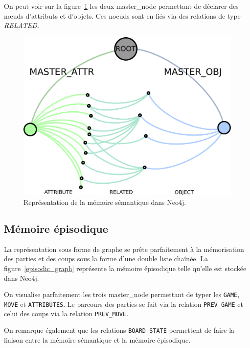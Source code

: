 On peut voir sur la figure~\ref{lattice_graph} les deux \og master\_node \fg{} permettant de déclarer des nœuds d'attributs et d'objets. Ces noeuds sont en liés via des relations de type \emph{RELATED}.

\begin{figure}[H]
\includegraphics[width=\textwidth]{files/neo4j/lattice_graph}
\caption{Représentation de la mémoire sémantique dans Neo4j.}
\label{lattice_graph}
\end{figure}

\subsection{Mémoire épisodique}

La représentation sous forme de graphe se prête parfaitement à la mémorisation des parties et des coups sous la forme d'une double liste chaînée. La figure~\ref{episodic_graph} représente la mémoire épisodique telle qu'elle est stockée dans Neo4j.

On visualise parfaitement les trois \og master\_node \fg{} permettant de typer les \texttt{GAME}, \texttt{MOVE} et \texttt{ATTRIBUTES}. Le parcours des parties se fait via la relation \texttt{PREV\_GAME} et celui des coups via la relation \texttt{PREV\_MOVE}.

On remarque également que les relations \texttt{BOARD\_STATE} permettent de faire la liaison entre la mémoire sémantique et la mémoire épisodique.

